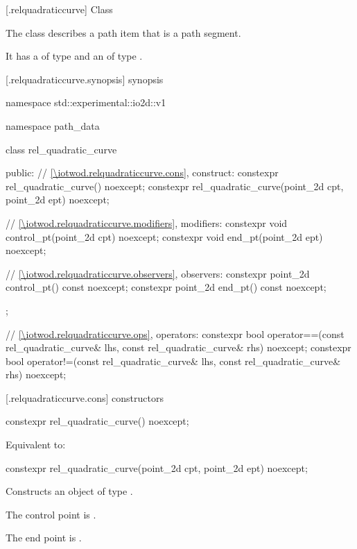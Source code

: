  [\iotwod.relquadraticcurve] {Class }

\pnum
{}%
The class  describes a path item that is a path segment.

\pnum
It has a  of type  and an  of type .

 [\iotwod.relquadraticcurve.synopsis] { synopsis}

\begin{codeblock}
namespace std::experimental::io2d::v1 {
  namespace path_data {
    class rel_quadratic_curve {
    public:
      // \ref{\iotwod.relquadraticcurve.cons}, construct:
      constexpr rel_quadratic_curve() noexcept;
      constexpr rel_quadratic_curve(point_2d cpt, point_2d ept)
        noexcept;

      // \ref{\iotwod.relquadraticcurve.modifiers}, modifiers:
      constexpr void control_pt(point_2d cpt) noexcept;
      constexpr void end_pt(point_2d ept) noexcept;

      // \ref{\iotwod.relquadraticcurve.observers}, observers:
      constexpr point_2d control_pt() const noexcept;
      constexpr point_2d end_pt() const noexcept;
    };
    
    // \ref{\iotwod.relquadraticcurve.ops}, operators:
    constexpr bool operator==(const rel_quadratic_curve& lhs,
      const rel_quadratic_curve& rhs) noexcept;
    constexpr bool operator!=(const rel_quadratic_curve& lhs,
      const rel_quadratic_curve& rhs) noexcept;
  }
}
\end{codeblock}

 [\iotwod.relquadraticcurve.cons] { constructors}

%
\begin{itemdecl}
constexpr rel_quadratic_curve() noexcept;
\end{itemdecl}
\begin{itemdescr}
\pnum
\effects
Equivalent to: 
\end{itemdescr}

%
\begin{itemdecl}
constexpr rel_quadratic_curve(point_2d cpt, point_2d ept)
  noexcept;
\end{itemdecl}
\begin{itemdescr}
\pnum
\effects
Constructs an object of type .

\pnum
The control point is .

\pnum
The end point is .
\end{itemdescr}

